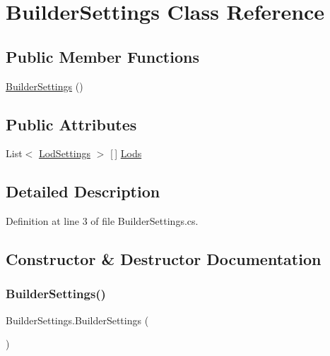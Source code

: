 \hypertarget{class_builder_settings}{}\section{Builder\+Settings Class Reference}
\label{class_builder_settings}
\subsection*{Public Member Functions}
\begin{DoxyCompactItemize}
\item 
\mbox{\hyperlink{class_builder_settings_ac73d6ecb0d660bca8654b24161723c66}{Builder\+Settings}} ()
\end{DoxyCompactItemize}
\subsection*{Public Attributes}
\begin{DoxyCompactItemize}
\item 
List$<$ \mbox{\hyperlink{class_lod_settings}{Lod\+Settings}} $>$ \mbox{[}$\,$\mbox{]} \mbox{\hyperlink{class_builder_settings_a88e4ad513d7779376f9b94ec9201c49a}{Lods}}
\end{DoxyCompactItemize}


\subsection{Detailed Description}


Definition at line 3 of file Builder\+Settings.\+cs.



\subsection{Constructor \& Destructor Documentation}
\mbox{\label{class_builder_settings_ac73d6ecb0d660bca8654b24161723c66}} 
\subsubsection{\texorpdfstring{BuilderSettings()}{BuilderSettings()}}
{\footnotesize\ttfamily Builder\+Settings.\+Builder\+Settings (\begin{DoxyParamCaption}{ }\end{DoxyParamCaption})}



